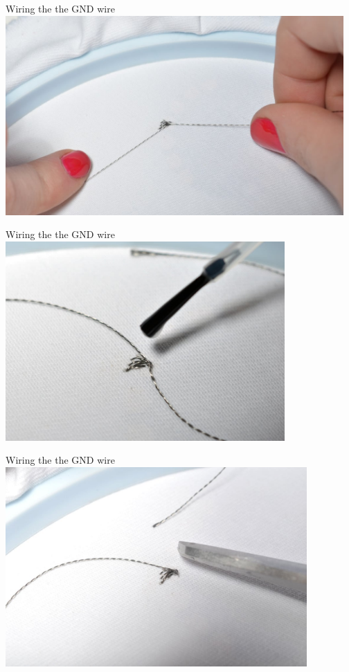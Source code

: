 \documentclass{beamer}
\begin{document}
\begin{frame}[fragile]{Wiring the the GND wire}
\includegraphics[height=3in]{flora_DSC_0107.jpg}
\end{frame}
\begin{frame}[fragile]{Wiring the the GND wire}
\includegraphics[height=3in]{flora_DSC_0109.jpg}
\end{frame}
\begin{frame}[fragile]{Wiring the the GND wire}
\includegraphics[height=3in]{flora_DSC_0111.jpg}
\end{frame}
\end{document}
